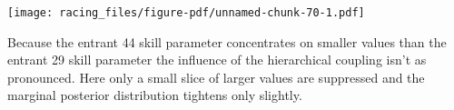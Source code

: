 \documentclass[
  letterpaper,
  DIV=11,
  numbers=noendperiod]{scrartcl}
\newenvironment{Shaded}{\begin{snugshade}}{\end{snugshade}}
\newcommand{\AttributeTok}[1]{\textcolor[rgb]{0.40,0.45,0.13}{#1}}
\newcommand{\ControlFlowTok}[1]{\textcolor[rgb]{0.00,0.23,0.31}{#1}}
\newcommand{\FloatTok}[1]{\textcolor[rgb]{0.68,0.00,0.00}{#1}}
\newcommand{\FunctionTok}[1]{\textcolor[rgb]{0.28,0.35,0.67}{#1}}
\newcommand{\NormalTok}[1]{\textcolor[rgb]{0.00,0.23,0.31}{#1}}
\newcommand{\OtherTok}[1]{\textcolor[rgb]{0.00,0.23,0.31}{#1}}
\newcommand{\SpecialCharTok}[1]{\textcolor[rgb]{0.37,0.37,0.37}{#1}}
\newcommand{\StringTok}[1]{\textcolor[rgb]{0.13,0.47,0.30}{#1}}
\begin{document}
\begin{Shaded}
\end{Shaded}

\texttt{[image: racing\_files/figure-pdf/unnamed-chunk-70-1.pdf]}

Because the entrant 44 skill parameter concentrates on smaller values
than the entrant 29 skill parameter the influence of the hierarchical
coupling isn't as pronounced. Here only a small slice of larger values
are suppressed and the marginal posterior distribution tightens only
slightly.
\end{document}
